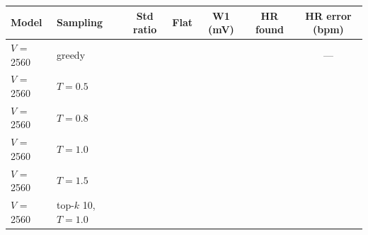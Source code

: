 \begin{tabular}{llccccc}
\toprule
Model & Sampling & Std ratio & Flat & W1 (mV) & HR found & HR error (bpm) \\
\midrule
$V$ = 2560 & greedy & \generativeGenVocabTwoFiveSixZeroGreedyStdRatio{} & \generativeGenVocabTwoFiveSixZeroGreedyFracFlat{} & \generativeGenVocabTwoFiveSixZeroGreedyWOneMv{} & \generativeGenVocabTwoFiveSixZeroGreedyHrDefinedFrac{} & --- \\
$V$ = 2560 & $T = 0.5$ & \generativeGenVocabTwoFiveSixZeroTZeroFiveStdRatio{} & \generativeGenVocabTwoFiveSixZeroTZeroFiveFracFlat{} & \generativeGenVocabTwoFiveSixZeroTZeroFiveWOneMv{} & \generativeGenVocabTwoFiveSixZeroTZeroFiveHrDefinedFrac{} & \generativeGenVocabTwoFiveSixZeroTZeroFiveHrMae{} \\
$V$ = 2560 & $T = 0.8$ & \generativeGenVocabTwoFiveSixZeroTZeroEightStdRatio{} & \generativeGenVocabTwoFiveSixZeroTZeroEightFracFlat{} & \generativeGenVocabTwoFiveSixZeroTZeroEightWOneMv{} & \generativeGenVocabTwoFiveSixZeroTZeroEightHrDefinedFrac{} & \generativeGenVocabTwoFiveSixZeroTZeroEightHrMae{} \\
$V$ = 2560 & $T = 1.0$ & \generativeGenVocabTwoFiveSixZeroTOneZeroStdRatio{} & \generativeGenVocabTwoFiveSixZeroTOneZeroFracFlat{} & \generativeGenVocabTwoFiveSixZeroTOneZeroWOneMv{} & \generativeGenVocabTwoFiveSixZeroTOneZeroHrDefinedFrac{} & \generativeGenVocabTwoFiveSixZeroTOneZeroHrMae{} \\
$V$ = 2560 & $T = 1.5$ & \generativeGenVocabTwoFiveSixZeroTOneFiveStdRatio{} & \generativeGenVocabTwoFiveSixZeroTOneFiveFracFlat{} & \generativeGenVocabTwoFiveSixZeroTOneFiveWOneMv{} & \generativeGenVocabTwoFiveSixZeroTOneFiveHrDefinedFrac{} & \generativeGenVocabTwoFiveSixZeroTOneFiveHrMae{} \\
$V$ = 2560 & top-$k$ 10, $T = 1.0$ & \generativeGenVocabTwoFiveSixZeroTopkOneZeroStdRatio{} & \generativeGenVocabTwoFiveSixZeroTopkOneZeroFracFlat{} & \generativeGenVocabTwoFiveSixZeroTopkOneZeroWOneMv{} & \generativeGenVocabTwoFiveSixZeroTopkOneZeroHrDefinedFrac{} & \generativeGenVocabTwoFiveSixZeroTopkOneZeroHrMae{} \\

\end{tabular}
